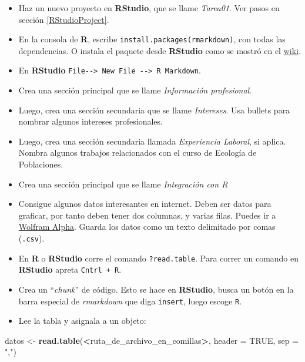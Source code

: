 \documentclass[12pt,letterpaper,]{book}
\newenvironment{Shaded}{\begin{snugshade}}{\end{snugshade}}
\newcommand{\KeywordTok}[1]{\textcolor[rgb]{0.13,0.29,0.53}{\textbf{#1}}}
\newcommand{\DataTypeTok}[1]{\textcolor[rgb]{0.13,0.29,0.53}{#1}}
\newcommand{\StringTok}[1]{\textcolor[rgb]{0.31,0.60,0.02}{#1}}
\newcommand{\OtherTok}[1]{\textcolor[rgb]{0.56,0.35,0.01}{#1}}
\newcommand{\OperatorTok}[1]{\textcolor[rgb]{0.81,0.36,0.00}{\textbf{#1}}}
\newcommand{\NormalTok}[1]{#1}
\begin{document}
\begin{itemize}
\item
  Haz un nuevo proyecto en \textbf{RStudio}, que se llame
  \emph{Tarea01}. Ver pasos en sección \ref{RStudioProject}.
\item
  En la consola de \textbf{R}, escribe
  \texttt{install.packages(rmarkdown)}, con todas las dependencias. O
  instala el paquete desde \textbf{RStudio} como se mostró en el
  \href{https://github.com/dawidh15/dinPob/wiki/02-Instalaci\%C3\%B3n-del-software-necesario}{wiki}.
\item
  En \textbf{RStudio}
  \texttt{File-\/-\textgreater{}\ New\ File\ -\/-\textgreater{}\ R\ Markdown}.
\item
  Crea una sección principal que se llame \emph{Información
  profesional}.
\item
  Luego, crea una sección secundaria que se llame \emph{Intereses}. Usa
  bullets para nombrar algunos intereses profesionales.
\item
  Luego, crea una sección secundaria llamada \emph{Experiencia Laboral},
  si aplica. Nombra algunos trabajos relacionados con el curso de
  Ecología de Poblaciones.
\item
  Crea una sección principal que se llame \emph{Integración con R}
\item
  Consigue algunos datos interesantes en internet. Deben ser datos para
  graficar, por tanto deben tener dos columnas, y varias filas. Puedes
  ir a \href{https://www.wolframalpha.com/}{Wolfram Alpha}. Guarda los
  datos como un texto delimitado por comas (\texttt{.csv}).
\item
  En \textbf{R} o \textbf{RStudio} corre el comando
  \texttt{?read.table}. Para correr un comando en \textbf{RStudio}
  apreta \texttt{Cntrl\ +\ R}.
\item
  Crea un ``\emph{chunk}'' de código. Esto se hace en \textbf{RStudio},
  busca un botón en la barra especial de \emph{rmarkdown} que diga
  \texttt{insert}, luego escoge \texttt{R}.
\item
  Lee la tabla y asignala a un objeto:
\end{itemize}

\begin{Shaded}
\begin{Highlighting}[]
\NormalTok{datos <-}\StringTok{ }\KeywordTok{read.table}\NormalTok{(}\OperatorTok{<}\NormalTok{ruta_de_archivo_en_comillas}\OperatorTok{>}\NormalTok{,}
                    \DataTypeTok{header =} \OtherTok{TRUE}\NormalTok{,}
                    \DataTypeTok{sep =} \StringTok{","}\NormalTok{)}
\end{Highlighting}
\end{Shaded}
\end{document}
